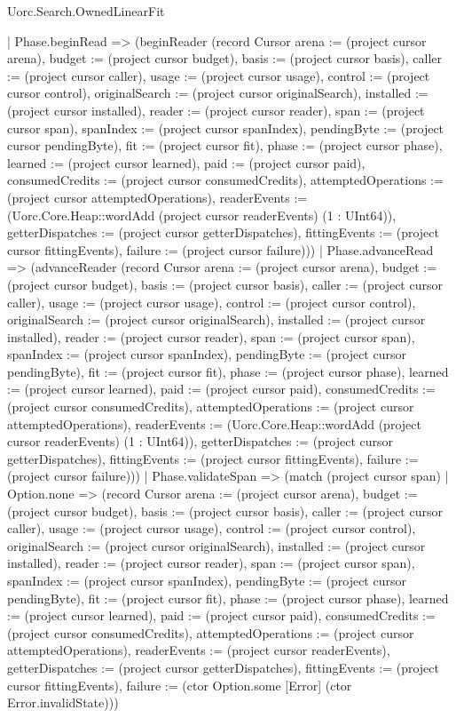\begin{lexlean}{Uorc.Search.OwnedLinearFit}
\begin{semanticmodule}
{    | Phase.beginRead => (beginReader (record Cursor {arena := (project cursor arena), budget := (project cursor budget), basis := (project cursor basis), caller := (project cursor caller), usage := (project cursor usage), control := (project cursor control), originalSearch := (project cursor originalSearch), installed := (project cursor installed), reader := (project cursor reader), span := (project cursor span), spanIndex := (project cursor spanIndex), pendingByte := (project cursor pendingByte), fit := (project cursor fit), phase := (project cursor phase), learned := (project cursor learned), paid := (project cursor paid), consumedCredits := (project cursor consumedCredits), attemptedOperations := (project cursor attemptedOperations), readerEvents := (Uorc.Core.Heap::wordAdd (project cursor readerEvents) (1 : UInt64)), getterDispatches := (project cursor getterDispatches), fittingEvents := (project cursor fittingEvents), failure := (project cursor failure)}))
    | Phase.advanceRead => (advanceReader (record Cursor {arena := (project cursor arena), budget := (project cursor budget), basis := (project cursor basis), caller := (project cursor caller), usage := (project cursor usage), control := (project cursor control), originalSearch := (project cursor originalSearch), installed := (project cursor installed), reader := (project cursor reader), span := (project cursor span), spanIndex := (project cursor spanIndex), pendingByte := (project cursor pendingByte), fit := (project cursor fit), phase := (project cursor phase), learned := (project cursor learned), paid := (project cursor paid), consumedCredits := (project cursor consumedCredits), attemptedOperations := (project cursor attemptedOperations), readerEvents := (Uorc.Core.Heap::wordAdd (project cursor readerEvents) (1 : UInt64)), getterDispatches := (project cursor getterDispatches), fittingEvents := (project cursor fittingEvents), failure := (project cursor failure)}))
    | Phase.validateSpan => (match (project cursor span)
      | Option.none => (record Cursor {arena := (project cursor arena), budget := (project cursor budget), basis := (project cursor basis), caller := (project cursor caller), usage := (project cursor usage), control := (project cursor control), originalSearch := (project cursor originalSearch), installed := (project cursor installed), reader := (project cursor reader), span := (project cursor span), spanIndex := (project cursor spanIndex), pendingByte := (project cursor pendingByte), fit := (project cursor fit), phase := (project cursor phase), learned := (project cursor learned), paid := (project cursor paid), consumedCredits := (project cursor consumedCredits), attemptedOperations := (project cursor attemptedOperations), readerEvents := (project cursor readerEvents), getterDispatches := (project cursor getterDispatches), fittingEvents := (project cursor fittingEvents), failure := (ctor Option.some [Error] (ctor Error.invalidState))})
}
\end{semanticmodule}
\end{lexlean}
